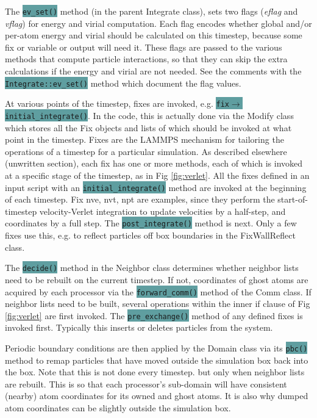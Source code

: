 \documentclass{article}
\newcommand{\code}[1]{\colorbox{cadetblue}{\color{white}\texttt{#1}}}
\begin{document}
The \code{ev\_set()} method (in the parent Integrate class), sets two flags
({\em eflag} and {\em vflag}) for energy and virial computation.  Each
flag encodes whether global and/or per-atom energy and virial should
be calculated on this timestep, because some fix or variable or output
will need it.  These flags are passed to the various methods that
compute particle interactions, so that they can skip the extra
calculations if the energy and virial are not needed.  See the
comments with the \code{Integrate::ev\_set()} method which document the flag
values.

At various points of the timestep, fixes are invoked,
e.g. \code{fix$\rightarrow$initial\_integrate()}.  In the code, this is
actually done via the Modify class which stores all the Fix objects
and lists of which should be invoked at what point in the timestep.
Fixes are the LAMMPS mechanism for tailoring the operations of a
timestep for a particular simulation.  As described elsewhere
(unwritten section), each fix has one or more methods, each of which
is invoked at a specific stage of the timestep, as in Fig
\ref{fig:verlet}.  All the fixes defined in an input script with an
\code{initial\_integrate()} method are invoked at the beginning of each
timestep.  Fix nve, nvt, npt are examples, since they perform the
start-of-timestep velocity-Verlet integration to update velocities by
a half-step, and coordinates by a full step.  The \code{post\_integrate()}
method is next.  Only a few fixes use this, e.g. to reflect particles
off box boundaries in the FixWallReflect class.

The \code{decide()} method in the Neighbor class determines whether neighbor
lists need to be rebuilt on the current timestep.  If not, coordinates
of ghost atoms are acquired by each processor via the \code{forward\_comm()}
method of the Comm class.  If neighbor lists need to be built, several
operations within the inner if clause of Fig \ref{fig:verlet} are
first invoked.  The \code{pre\_exchange()} method of any defined fixes is
invoked first.  Typically this inserts or deletes particles from the
system.

Periodic boundary conditions are then applied by the Domain class via
its \code{pbc()} method to remap particles that have moved outside the
simulation box back into the box.  Note that this is not done every
timestep. but only when neighbor lists are rebuilt.  This is so that
each processor's sub-domain will have consistent (nearby) atom
coordinates for its owned and ghost atoms.  It is also why dumped atom
coordinates can be slightly outside the simulation box.
\end{document}
